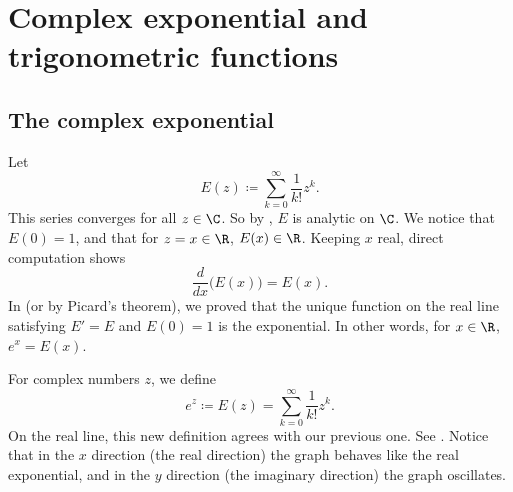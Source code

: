 \section{Complex exponential and trigonometric functions}
\label{sec:complexexp}



\subsection{The complex exponential}

Let
\begin{equation*}
E(z) \coloneqq \sum_{k=0}^\infty \frac{1}{k!} z^k .
\end{equation*}
This series converges for all $z \in \C$.
So by
, $E$ is analytic on $\C$.   We notice that $E(0) = 1$,
and that for $z=x \in \R$, $E(x) \in \R$.  Keeping $x$ real, direct
computation shows
\begin{equation*}
\frac{d}{dx} \bigl( E(x) \bigr) = E(x) .
\end{equation*}
In  (or by Picard's theorem), we proved that
the unique function on the real line satisfying $E' = E$ and
$E(0) = 1$ is the exponential.  In other words, for $x \in \R$, $e^x = E(x)$.

For complex numbers $z$, we define
\begin{equation*}
e^z \coloneqq E(z) = 
\sum_{k=0}^\infty \frac{1}{k!} z^k .
\end{equation*}
On the real line, this new definition agrees with our previous one.
See .  Notice that in the $x$ direction
(the real direction)
the graph behaves like the real exponential, and in the $y$ direction
(the imaginary direction) the graph oscillates.

\begin{myfigureht}
\caption{Graphs of the real part (left) and imaginary part (right)
of the complex exponential $e^z = e^{x+iy}$.  The $x$-axis goes from $-4$ to
$4$, the $y$-axis goes from $-6$ to $6$, and the vertical axis goes from
$-e^{4} \approx -54.6$
to
$e^{4} \approx 54.6$.  The plot of the real exponential ($y=0$)
is marked in a bold line.\label{fig:complexexpgraphs}}
\end{myfigureht}

